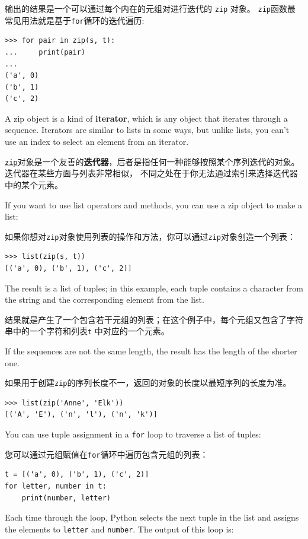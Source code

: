 输出的结果是一个可以通过每个内在的元组对进行迭代的 \lstinline{zip} 对象。 \lstinline{zip}函数最常见用法就是基于\lstinline{for}循环的迭代遍历:

\begin{lstlisting}
>>> for pair in zip(s, t):
...     print(pair)
...
('a', 0)
('b', 1)
('c', 2)
\end{lstlisting}

%
A zip object is a kind of {\bf iterator}, which is any object
that iterates through a sequence.  Iterators are similar to lists in some
ways, but unlike lists, you can't use an index to select an element from
an iterator.

\href{https://docs.python.org/3/library/functions.html#zip}{\lstinline{zip}}对象是一个友善的\textbf{迭代器}，后者是指任何一种能够按照某个序列迭代的对象。 迭代器在某些方面与列表非常相似， 不同之处在于你无法通过索引来选择迭代器中的某个元素。
 

If you want to use list operators and methods, you can
use a zip object to make a list:

如果你想对\lstinline {zip}对象使用列表的操作和方法，你可以通过\lstinline {zip}对象创造一个列表：

\begin{lstlisting}
>>> list(zip(s, t))
[('a', 0), ('b', 1), ('c', 2)]
\end{lstlisting}

%
The result is a list of tuples; in this example, each tuple contains
a character from the string and the corresponding element from
the list.

结果就是产生了一个包含若干元组的列表；在这个例子中，每个元组又包含了字符串中的一个字符和列表\lstinline {t} 中对应的一个元素。

If the sequences are not the same length, the result has the
length of the shorter one.

如果用于创建\lstinline{zip}的序列长度不一，返回的对象的长度以最短序列的长度为准。

\begin{lstlisting}
>>> list(zip('Anne', 'Elk'))
[('A', 'E'), ('n', 'l'), ('n', 'k')]
\end{lstlisting}
%
You can use tuple assignment in a {\tt for} loop to traverse a list of
tuples:

您可以通过元组赋值在\lstinline{for}循环中遍历包含元组的列表：
  

\begin{lstlisting}
t = [('a', 0), ('b', 1), ('c', 2)]
for letter, number in t:
    print(number, letter)
\end{lstlisting}
%
Each time through the loop, Python selects the next tuple in
the list and assigns the elements to {\tt letter} and
{\tt number}.  The output of this loop is:

